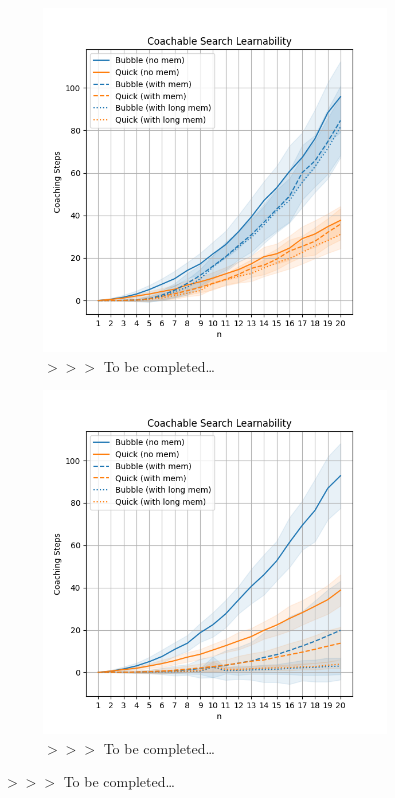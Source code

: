 \documentclass[a4paper, 10pt]{article}
\newcommand{\edcom}[1]{{\sf\color{red}$>>>$ #1}}
\newcommand{\tbc}{\edcom{To be completed\ldots}}
\begin{document}
	\begin{figure}[!tb]
		\centering%
		\hfill%
		\begin{subfigure}[t]{0.47\textwidth}
			\centering
			\includegraphics[width=\linewidth]{../CLARIF-i-stable/plots/full_condition_learnability.png}
			\caption{\tbc}
			\label{fig:full sorting coaching results}
		\end{subfigure}%
		\hfill%
		\begin{subfigure}[t]{0.47\textwidth}
			\centering
			\includegraphics[width=\linewidth]{../CLARIF-i-stable/plots/partial_condition_learnability.png}
			\caption{\tbc}
			\label{fig:partial sorting coaching results}
		\end{subfigure}%
		\hfill%
		\caption{\tbc}
		\label{fig:full and partial sorting coaching results}
	\end{figure}
\end{document}
